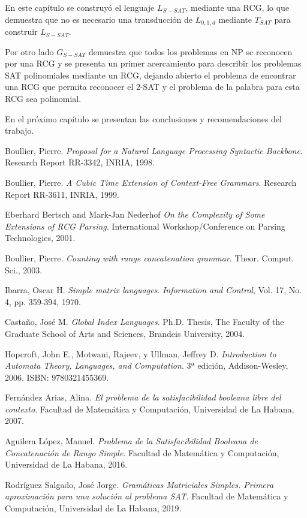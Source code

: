 \documentclass[12pt]{article}
\begin{document}
En este capítulo se construyó el lenguaje $L_{S-SAT}$, mediante una RCG, lo que demuestra que no es necesario una transducción de $L_{0,1,d}$ mediante $T_{SAT}$ para construir $L_{S-SAT}$.

Por otro lado $G_{S-SAT}$ demuestra que todos los problemas en NP se reconocen por una RCG y se presenta un primer acercamiento para describir los problemas SAT polinomiales mediante un RCG, dejando abierto el problema de encontrar una RCG que permita reconocer el 2-SAT y el problema de la palabra para esta RCG sea polinomial.

En el próximo capítulo se presentan las conclusiones y recomendaciones del trabajo.

\begin{thebibliography}{99}
    
    Boullier, Pierre.
    \textit{Proposal for a Natural Language Processing Syntactic Backbone}.
    Research Report RR-3342, INRIA, 1998.
    
    Boullier, Pierre.
    \textit{A Cubic Time Extension of Context-Free Grammars}.
    Research Report RR-3611, INRIA, 1999.
    
    Eberhard Bertsch and Mark-Jan Nederhof
    \textit{On the Complexity of Some Extensions of RCG Parsing}.
    International Workshop/Conference on Parsing Technologies, 2001.
    
    Boullier, Pierre.
    \textit{Counting with range concatenation grammar}.
    Theor. Comput. Sci., 2003.
    
    Ibarra, Oscar H.
    \textit{Simple matrix languages}.
    \textit{Information and Control}, Vol. 17, No. 4, pp. 359-394, 1970.
    
    Castaño, José M.
    \textit{Global Index Languages}.
    Ph.D. Thesis, The Faculty of the Graduate School of Arts and Sciences, Brandeis University, 2004.
    
    Hopcroft, John E., Motwani, Rajeev, y Ullman, Jeffrey D.
    \textit{Introduction to Automata Theory, Languages, and Computation}.
    3ª edición, Addison-Wesley, 2006. ISBN: 9780321455369.
    
    Fernández Arias, Alina.
    \textit{El problema de la satisfacibilidad booleana libre del contexto}.
    Facultad de Matemática y Computación, Universidad de La Habana, 2007.
    
    Aguilera López, Manuel.
    \textit{Problema de la Satisfacibilidad Booleana de Concatenación de Rango Simple}.
    Facultad de Matemática y Computación, Universidad de La Habana, 2016.
    
    Rodríguez Salgado, José Jorge.
    \textit{Gramáticas Matriciales Simples. Primera aproximación para una solución al problema SAT}.
    Facultad de Matemática y Computación, Universidad de La Habana, 2019.
    
\end{thebibliography}
\end{document}
